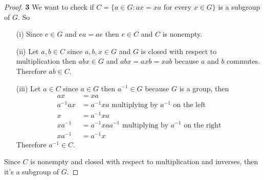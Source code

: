 \documentclass[11pt]{article}
\begin{document}
	\begin{proof}{\textbf{3}}
		We want to check if $C=\{a \in G: ax=xa \text{ for every } x \in G\}$ is a subgroup of $G$. So
		\begin{itemize}
			\item[(i)] Since $e \in G$ and $ea=ae$ then $e \in C$ and $C$ is nonempty.
			\item[(ii)] Let $a,b \in C$ since $a,b,x \in G$ and $G$ is closed with respect to multiplication then $abx \in G$ and $abx=axb=xab$ because $a$ and $b$ commutes. Therefore $ab \in C$.
			\item[(iii)] Let $a \in C$ since $a \in G$ then $a^{-1} \in G$ because $G$ is a group, then
			\begin{align*}
				ax & =xa  \\
				a^{-1}ax & = a^{-1}xa \text{ multiplying by }a^{-1} \text{ on the left}\\
				x & = a^{-1}xa \\
				xa^{-1} & = a^{-1}xaa^{-1} \text{ multiplying by }a^{-1} \text{ on the right}\\
				xa^{-1} & = a^{-1}x
			\end{align*}
			Therefore $a^{-1} \in C$.
		\end{itemize}
		Since $C$ is nonempty and closed with respect to multiplication and inverses, then it's a subgroup of $G$.
	\end{proof}
\end{document}
